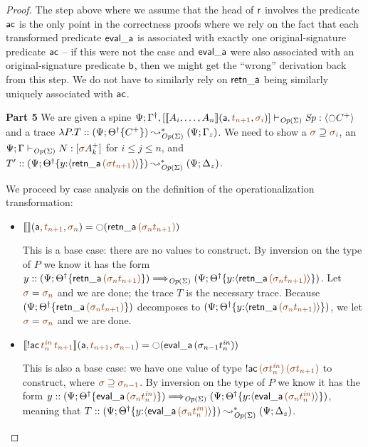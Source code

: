 \begin{proof}
The step above where we assume that the head of ${\sf r}$ involves the
predicate ${\sf ac}$ is the only point in the correctness proofs where
we rely on the fact that each transformed predicate ${\sf eval\_a}$ is
associated with exactly one original-signature predicate ${\sf ac}$ --
if this were not the case and ${\sf eval\_a}$ were also associated
with an original-signature predicate ${\sf b}$, then we might get the
``wrong'' derivation back from this step. We do not have to similarly
rely on ${\sf retn\_a}$ being similarly uniquely associated with ${\sf
  ac}$.


\bigskip\noindent
{\bf Part 5}
We are given a spine
$\slst{\transop{\Sigma}}{\Psi}
  {\opsubst{\Gamma},[\opbasic{A_i,\ldots,A_n}{t_{n+1}}{\sigma_i}]}
  {\Sp}{\susp{{\ocircle}C^+}}$ and a trace
$\lambda P.T :: (\Psi; {{{\Theta}^\dag}}\{{C^+}\})
         \leadsto^*_{{\it Op}({\Sigma})}
       (\Psi; \Gamma_z)$. 
We need to show a $\lf{\sigma} \supseteq \lf{\sigma_i}$, an
$\slst{\transop{\Sigma}}{\Psi}{\Gamma}{N}{[\lf\sigma A^+_k]}$
for $i \leq j \leq n$, and 
$T' :: (\Psi; \tackon{\opsubst{\Theta}}{y{:}\susp{{\sf retn\_a}\,\lf{(\lf{\sigma t_{n+1}})}}})
  \leadsto^*_{\transop{\Sigma}}
 (\Psi; \Delta_z)$.

We proceed by case analysis on the definition of
the operationalization transformation:
\begin{itemize}
\item $\opbasic{}{t_{n+1}}{\sigma_n} = {\ocircle}({\sf retn\_a}\,\lf{(\sigma_{n}{t_{n+1}})})$

  \bigskip
  This is a base case: there are no values to construct. By inversion on the
  type of $P$ we know it has the form
  $y :: (\Psi; \tackon{\opsubst{\Theta}}{{\sf retn\_a}\,\lf{(\sigma_{n}{t_{n+1}})}}) \Longrightarrow_{\transop{\Sigma}} (\Psi; \tackon{\opsubst{\Theta}}{y{:}\susp{{\sf retn\_a}\,\lf{(\sigma_{n}{t_{n+1}})}}})$. 
  Let $\lf{\sigma} = \lf{\sigma_n}$
  and we are done; the trace $T$ is the necessary trace. 
  Because
  $(\Psi; \tackon{\opsubst{\Theta}}{{\sf retn\_a}\,\lf{(\sigma_{n}{t_{n+1}})}})$
  decomposes to 
  $(\Psi; \tackon{\opsubst{\Theta}}{y{:}\susp{{\sf retn\_a}\,\lf{(\sigma_{n}{t_{n+1}})}}})$, we let $\lf{\sigma} = \lf{\sigma_n}$ and we are done.
  \bigskip

\item $\opbasic{{!}{\sf ac}\,\lf{t^{\it in}_n}\,\lf{t_{n+1}}}{t_{n+1}}{\sigma_{n-1}} 
  = {\ocircle}({\sf eval\_a}\,(\sigma_{n-1}{t^{\it in}_n}))$

  \bigskip
  This is also a base case: we have one value of type 
  ${!}{\sf ac}\,\lf{({\sigma}t^{\it in}_n)}\,\lf{({\sigma}t_{n+1})}$ to construct, where
  $\lf{\sigma} \supseteq \lf{\sigma_{n-1}}$. By inversion on the type of
  $P$ we know it has the form 
  $y :: (\Psi; \tackon{\opsubst{\Theta}}{{\sf eval\_a}\,\lf{(\sigma_{n}{t^{\it in}_{n}})}}) \Longrightarrow_{\transop{\Sigma}}
     (\Psi; \tackon{\opsubst{\Theta}}
            {y{:}\susp{{\sf eval\_a}\,\lf{(\sigma_{n}{t^{\it in}_{n}})}}})$, 
  meaning that $T :: (\Psi; \tackon{\opsubst{\Theta}}
            {y{:}\susp{{\sf eval\_a}\,\lf{(\sigma_{n}{t^{\it in}_{n}})}}})
    \leadsto^*_{\transop{\Sigma}}
 (\Psi; \Delta_z)$.


\end{itemize}
\end{proof}
